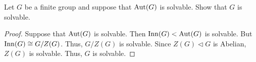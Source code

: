 \begin{problem}
Let $G$ be a finite group and suppose that $\operatorname{Aut}(G)$ is solvable. Show that
$G$ is solvable.
\end{problem}
\begin{proof}
Suppose that $\operatorname{Aut}(G)$ is solvable. Then $\operatorname{Inn}(G)<\operatorname{Aut}(G)$ is solvable. But
$\operatorname{Inn}(G)\cong G/Z(G)$. Thus, $G/Z(G)$ is solvable. Since $Z(G)\lhd G$ is
Abelian, $Z(G)$ is solvable. Thus, $G$ is solvable.
\end{proof}

